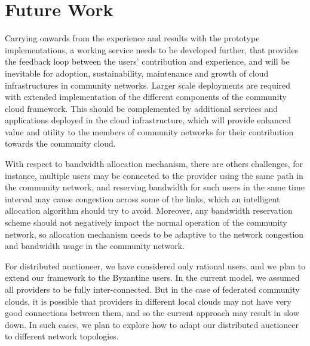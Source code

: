 
\section{Future Work}
\label{sec__future_work}

Carrying onwards from the experience and results with the prototype implementations, 
a working service needs to be developed further, 
that provides the feedback loop between the users' contribution and experience, 
and will be inevitable for adoption, sustainability, maintenance and growth of cloud infrastructures in community networks. 
Larger scale deployments are required with extended implementation of the different components of the community cloud framework.
This should be complemented by additional services and applications deployed in the cloud infrastructure, 
which will provide enhanced value and utility to the members of community networks for their contribution towards the community cloud. 

With respect to bandwidth allocation mechanism,
there are others challenges, for instance, multiple users may be connected to the provider 
using the same path in the community network, 
and reserving bandwidth for such users in the same time interval 
may cause congestion across some of the links, 
which an intelligent allocation algorithm should try to avoid.
Moreover, any bandwidth reservation scheme should not negatively impact the normal operation 
of the community network, 
so allocation mechanism needs to be adaptive to the network congestion and bandwidth usage in the community network.

For distributed auctioneer, we have considered only rational users, and we plan to extend our framework to the Byzantine users.
In the current model, we assumed all providers to be fully inter-connected. 
But in the case of federated community clouds, it is possible that
providers in different local clouds may not have very good connections between them, 
and so the current approach may result in slow down.
In such cases, we plan to explore how to adapt our distributed auctioneer to different network topologies.
